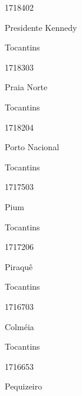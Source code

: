 \documentclass[
  letterpaper,
]{report}
\begin{document}
\n      

1718402

\n      

Presidente Kennedy

\n    

\n    

\n      

Tocantins

\n      

1718303

\n      

Praia Norte

\n    

\n    

\n      

Tocantins

\n      

1718204

\n      

Porto Nacional

\n    

\n    

\n      

Tocantins

\n      

1717503

\n      

Pium

\n    

\n    

\n      

Tocantins

\n      

1717206

\n      

Piraquê

\n    

\n    

\n      

Tocantins

\n      

1716703

\n      

Colméia

\n    

\n    

\n      

Tocantins

\n      

1716653

\n      

Pequizeiro

\n    
\end{document}
